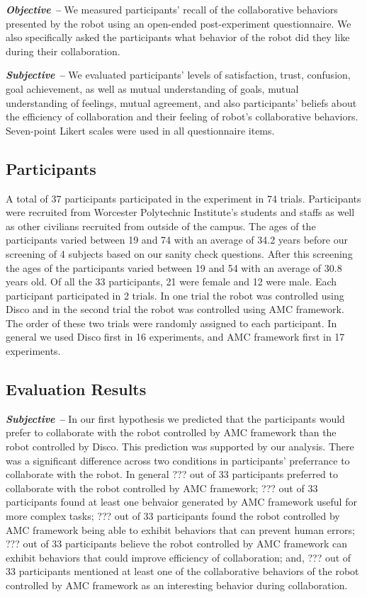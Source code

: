 \documentclass{sig-alternate-05-2015}
\begin{document}
\textit{\textbf{Objective -- }} We measured participants' recall of the
collaborative behaviors presented by the robot using an open-ended
post-experiment questionnaire. We also specifically asked the participants what
behavior of the robot did they like during their collaboration.

\textit{\textbf{Subjective -- }} We evaluated participants' levels of
satisfaction, trust, confusion, goal achievement, as well as mutual
understanding of goals, mutual understanding of feelings, mutual agreement, and
also participants' beliefs about the efficiency of collaboration and their
feeling of robot's collaborative behaviors. Seven-point Likert scales were used
in all questionnaire items.

\subsection{Participants}

A total of 37 participants participated in the experiment in 74 trials.
Participants were recruited from Worcester Polytechnic Institute's students and
staffs as well as other civilians recruited from outside of the campus. The ages
of the participants varied between 19 and 74 with an average of 34.2 years
before our screening of 4 subjects based on our sanity check questions. After
this screening the ages of the participants varied between 19 and 54 with an
average of 30.8 years old. Of all the 33 participants, 21 were female and 12
were male. Each participant participated in 2 trials. In one trial the robot was
controlled using Disco and in the second trial the robot was controlled using
AMC framework. The order of these two trials were randomly assigned to each
participant. In general we used Disco first in 16 experiments, and AMC framework
first in 17 experiments.

\subsection{Evaluation Results}

\textit{\textbf{Subjective -- }} In our first hypothesis we predicted that the
participants would prefer to collaborate with the robot controlled by AMC
framework than the robot controlled by Disco. This prediction was supported by
our analysis. There was a significant difference across two conditions in
participants' preferrance to collaborate with the robot. In general ??? out of
33 participants preferred to collaborate with the robot controlled by AMC
framework; ??? out of 33 participants found at least one behvaior generated by
AMC framework useful for more complex tasks; ??? out of 33 participants found
the robot controlled by AMC framework being able to exhibit behaviors that can
prevent human errors; ??? out of 33 participants believe the robot controlled by
AMC framework can exhibit behaviors that could improve efficiency of
collaboration; and, ??? out of 33 participants mentioned at least one of the
collaborative behaviors of the robot controlled by AMC framework as an
interesting behavior during collaboration.
\end{document}
